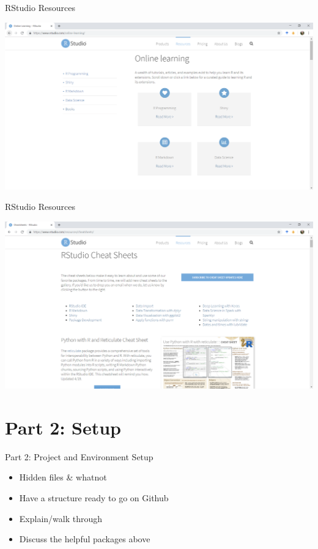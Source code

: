 \documentclass[
  ignorenonframetext,
]{beamer}
\providecommand{\tightlist}{%
  \setlength{\itemsep}{0pt}\setlength{\parskip}{0pt}}
\begin{document}
\begin{frame}{RStudio Resources}
\protect\hypertarget{rstudio-resources-1}{}

\includegraphics{../external/images/rstudio_dot_com_2_learning.PNG}

\end{frame}

\begin{frame}{RStudio Resources}
\protect\hypertarget{rstudio-resources-2}{}

\includegraphics{../external/images/rstudio_dot_com_3_cheats.PNG}

\end{frame}

\hypertarget{part-2-setup}{%
\section{Part 2: Setup}\label{part-2-setup}}

\begin{frame}{Part 2: Project and Environment Setup}
\protect\hypertarget{part-2-project-and-environment-setup}{}

\begin{itemize}
\tightlist
\item
  Hidden files \& whatnot
\item
  Have a structure ready to go on Github
\item
  Explain/walk through
\item
  Discuss the helpful packages above
\end{itemize}

\end{frame}
\end{document}
